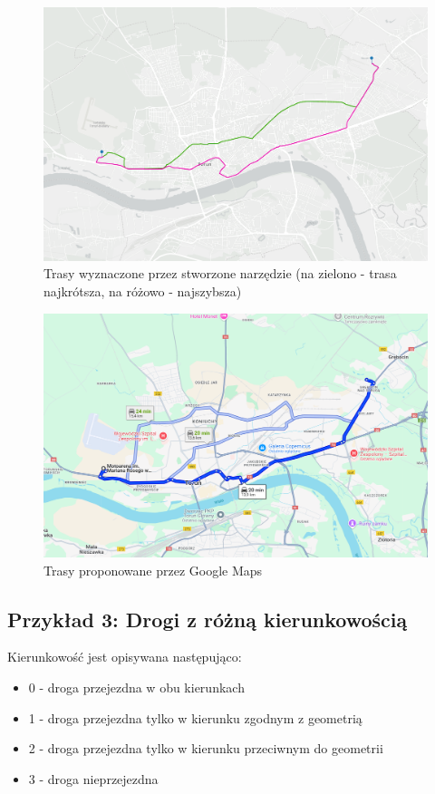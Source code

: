\documentclass{article}
\begin{document}
\begin{figure}[H]
    \centering
    \includegraphics[width=1\textwidth]{img/motoarena-rod.png}
    \caption{Trasy wyznaczone przez stworzone narzędzie (na zielono - trasa najkrótsza, na różowo - najszybsza)}
\end{figure}

\begin{figure}[H]
    \centering
    \includegraphics[width=1\textwidth]{img/motoarena-rod-google.png}
    \caption{Trasy proponowane przez Google Maps}
\end{figure}

\subsection{Przykład 3: Drogi z różną kierunkowością}
Kierunkowość jest opisywana następująco:
\begin{itemize}
    \item 0 - droga przejezdna w obu kierunkach
    \item 1 - droga przejezdna tylko w kierunku zgodnym z geometrią
    \item 2 - droga przejezdna tylko w kierunku przeciwnym do geometrii
    \item 3 - droga nieprzejezdna
\end{itemize}
\end{document}
